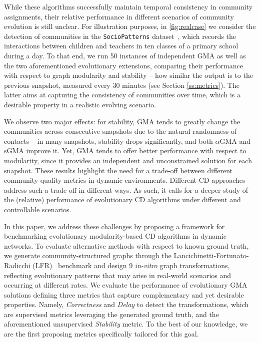 \documentclass[letterpaper]{article}
\begin{document}
While these algorithms successfully maintain temporal consistency in community assignments, their relative performance in different scenarios of community evolution is still unclear. For illustration purposes, in \cref{fig:realcase} we consider the detection of communities in the  \texttt{SocioPatterns} dataset~\cite{stehle2011dataset}, which records the interactions between children and teachers in ten classes of a primary school during a day. To that end, we run 50 instances of independent GMA as well as the two aforementioned evolutionary extensions, comparing their performance with respect to graph modularity and stability -- \ie how similar the output is to the previous snapshot, measured every 30 minutes (see Section \ref{ss:metrics}). The latter aims at capturing the consistency of communities over time, which is a desirable property in a realistic evolving scenario.

We observe two major effects: for stability, GMA tends to greatly change the communities across consecutive snapshots due to the natural randomness of contacts -- \ie in many snapshots, stability drops significantly, and both $\alpha$GMA and sGMA improve it.
Yet, GMA tends to offer better performance with respect to modularity, since it provides an independent and unconstrained solution for each snapshot.
These results highlight the need for a trade-off between different community quality metrics in dynamic environments. Different CD approaches address such a trade-off in different ways.
As such, it calls for a deeper study of the (relative) performance of evolutionary CD algorithms under different and controllable scenarios.

In this paper, we address these challenges by proposing a framework for benchmarking evolutionary modularity-based CD algorithms in dynamic networks. To evaluate alternative methods with respect to known ground truth, we generate community-structured graphs through the Lancichinetti-Fortunato-Radicchi (LFR)~\cite{lancichinetti2008benchmark} benchmark and design 9 \emph{in-vitro} graph transformations, reflecting evolutionary patterns that may arise in real-world scenarios and occurring at different rates.
We evaluate the performance of evolutionary GMA solutions defining three metrics that capture complementary and yet desirable properties. Namely, \emph{Correctness} and \emph{Delay} to detect the transformations, which are supervised metrics leveraging the generated ground truth, and the aforementioned unsupervised \emph{Stability} metric. To the best of our knowledge, we are the first proposing metrics specifically tailored for this goal.
\end{document}

